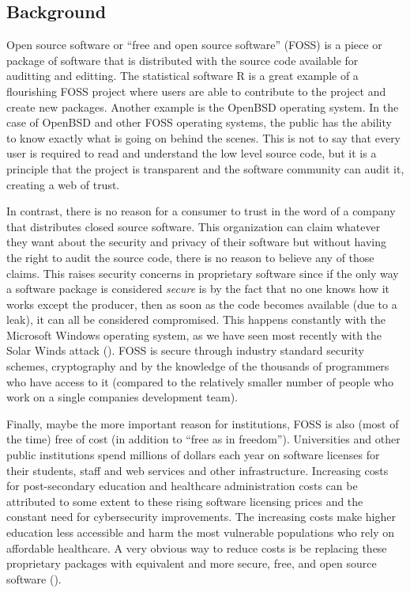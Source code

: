 \documentclass{article}
\theoremstyle{definition}
\begin{document}
\begin{flushleft}
\begin{multicols}{2}

\section{Background}
Open source software or ``free and open source software'' (FOSS)
is a piece or package of software
that is distributed with the source code available for
auditting and editting. The statistical software R is a
great example of a flourishing FOSS project where
users are able to contribute to the project and create new
packages. Another example is the OpenBSD operating system.
In the case of OpenBSD and other FOSS operating systems,
the public has the ability to know exactly what is going
on behind the scenes. This is not to say that every user
is required to read and understand the low level source
code, but it is a principle that the project is transparent
and the software community can audit it, creating a web of trust.

In contrast, there is no reason for a consumer to trust
in the word of a company that distributes closed source
software. This organization can claim whatever they want
about the security and privacy of their software but
without having the right to audit the source code,
there is no reason to believe any of those claims.
This raises security concerns in proprietary software since
if the only way a software package is considered \textit{secure}
is by the fact that no one knows how it works except the producer,
then as soon as the code becomes available (due to a leak), it can
all be considered compromised. This happens constantly with the Microsoft
Windows operating system, as we have seen most recently with the Solar
Winds attack (\cite{solarwinds2021}).
FOSS is secure through industry standard
security schemes, cryptography and by the knowledge of the thousands
of programmers who have access to it (compared to the relatively
smaller number of people who work on a single companies development
team).

Finally, maybe the more important reason for institutions,
FOSS is also (most of the time) free of cost (in addition
to ``free as in freedom'').
Universities and other public institutions
spend millions of dollars each year on software licenses
for their students, staff and web services and other
infrastructure. Increasing costs for post-secondary education and
healthcare administration costs can be attributed to some extent to
these rising software licensing prices and the constant
need for cybersecurity improvements. The increasing costs
make higher education less accessible and harm the most
vulnerable populations who rely on affordable healthcare.
A very obvious way to reduce
costs is be replacing these proprietary packages with equivalent
and more secure, free, and open source software (\cite{kenny2000}).


\end{multicols}
\end{flushleft}
\end{document}
